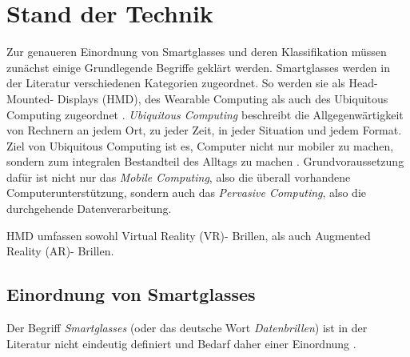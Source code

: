\chapter{Stand der Technik}
Zur genaueren Einordnung von Smartglasses und deren Klassifikation müssen zunächst einige Grundlegende Begriffe geklärt werden. Smartglasses werden in der Literatur verschiedenen Kategorien zugeordnet. So werden sie als Head-Mounted- Displays (HMD), des Wearable Computing als auch des Ubiquitous Computing zugeordnet \cite[S.~20]{ThomasDirkMetzgerHelmutNiegemannHrsg2018}. \emph{Ubiquitous Computing} beschreibt die Allgegenwärtigkeit von Rechnern an jedem Ort, zu jeder Zeit, in jeder Situation und jedem Format. Ziel von Ubiquitous Computing ist es, Computer nicht nur mobiler zu machen, sondern zum integralen Bestandteil des Alltags zu machen \cite[S.~24]{Schwenke2016}. Grundvoraussetzung dafür ist nicht nur das \emph{Mobile Computing}, also die überall vorhandene Computerunterstützung, sondern auch das \emph{Pervasive Computing}, also die durchgehende Datenverarbeitung.

HMD umfassen sowohl Virtual Reality (VR)- Brillen, als auch Augmented Reality (AR)- Brillen.

\section{Einordnung von Smartglasses}
Der Begriff \emph{Smartglasses} (oder das deutsche Wort \emph{Datenbrillen}) ist in der Literatur nicht eindeutig definiert und Bedarf daher einer Einordnung \cite[S.~26]{Schwenke2016}.

